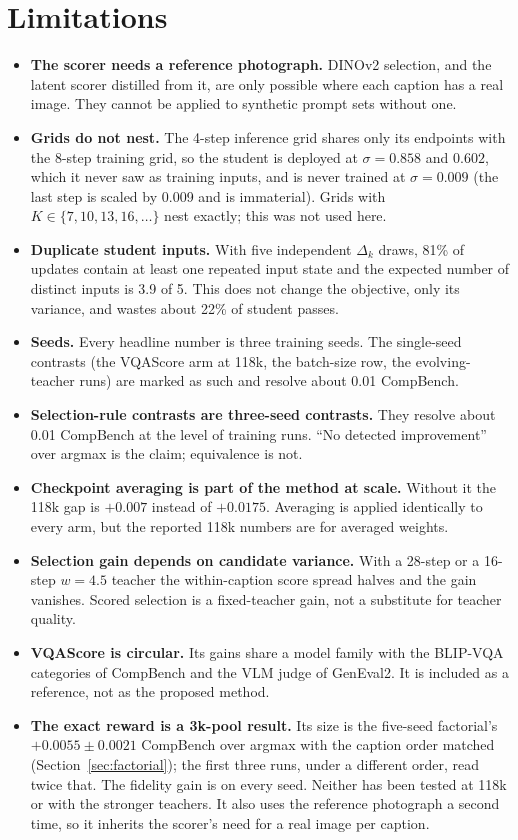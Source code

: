 \documentclass[11pt,a4paper]{article}
\begin{document}
\section{Limitations}
\begin{itemize}
\item \textbf{The scorer needs a reference photograph.} DINOv2 selection, and the latent scorer distilled from it, are only possible where each caption has a real image. They cannot be applied to synthetic prompt sets without one.
\item \textbf{Grids do not nest.} The 4-step inference grid shares only its endpoints with the 8-step training grid, so the student is deployed at $\sigma=0.858$ and $0.602$, which it never saw as training inputs, and is never trained at $\sigma=0.009$ (the last step is scaled by 0.009 and is immaterial). Grids with $K\in\{7,10,13,16,\dots\}$ nest exactly; this was not used here.
\item \textbf{Duplicate student inputs.} With five independent $\Delta_k$ draws, 81\% of updates contain at least one repeated input state and the expected number of distinct inputs is 3.9 of 5. This does not change the objective, only its variance, and wastes about 22\% of student passes.
\item \textbf{Seeds.} Every headline number is three training seeds. The single-seed contrasts (the VQAScore arm at 118k, the batch-size row, the evolving-teacher runs) are marked as such and resolve about 0.01 CompBench.
\item \textbf{Selection-rule contrasts are three-seed contrasts.} They resolve about 0.01 CompBench at the level of training runs. ``No detected improvement'' over argmax is the claim; equivalence is not.
\item \textbf{Checkpoint averaging is part of the method at scale.} Without it the 118k gap is $+0.007$ instead of $+0.0175$. Averaging is applied identically to every arm, but the reported 118k numbers are for averaged weights.
\item \textbf{Selection gain depends on candidate variance.} With a 28-step or a 16-step $w=4.5$ teacher the within-caption score spread halves and the gain vanishes. Scored selection is a fixed-teacher gain, not a substitute for teacher quality.
\item \textbf{VQAScore is circular.} Its gains share a model family with the BLIP-VQA categories of CompBench and the VLM judge of GenEval2. It is included as a reference, not as the proposed method.
\item \textbf{The exact reward is a 3k-pool result.} Its size is the five-seed factorial's $+0.0055\pm0.0021$ CompBench over argmax with the caption order matched (Section~\ref{sec:factorial}); the first three runs, under a different order, read twice that. The fidelity gain is on every seed. Neither has been tested at 118k or with the stronger teachers. It also uses the reference photograph a second time, so it inherits the scorer's need for a real image per caption.

\end{itemize}
\end{document}
